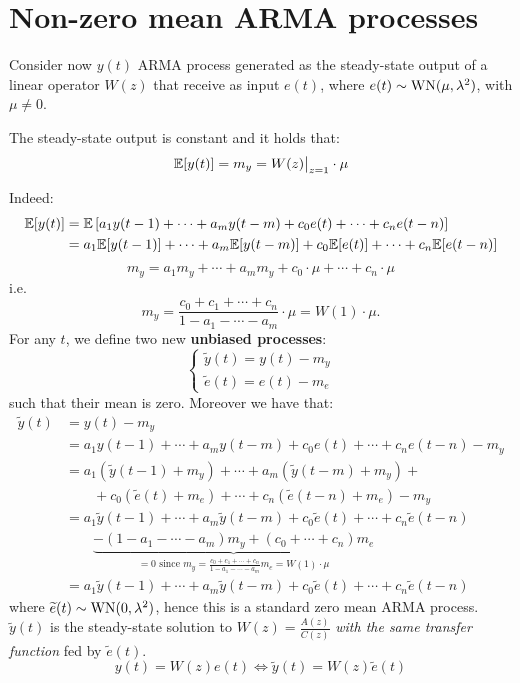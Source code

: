 \section{Non-zero mean ARMA processes}\label{sec:non-zero-mean-arma}
Consider now $y(t)$ ARMA process generated as the steady-state output of a linear operator $W(z)$ that receive as input $e(t)$, where $e(t) \sim \operatorname{WN}(\mu, \lambda^{2})$, with $\mu\neq0$.

\begin{thm}\label{thm:gain-theorem}
	The steady-state output is constant and it holds that:
	\[
		\mathbb{E}[y(t)]=m_{y}=W(z)\big|_{z=1} \cdot \mu
	\]
\end{thm}

Indeed:
\begin{align*}
		\mathbb{E}[y(t)] &=\mathbb{E}\left[a_{1} y(t-1)+\cdots+a_{m} y(t-m)+c_{0} e(t)+\cdots+c_{n} e(t-n)\right] \\
		&=a_{1} \mathbb{E}[y(t-1)]+\cdots+a_{m} \mathbb{E}[y(t-m)]+c_{0} \mathbb{E}[e(t)]+\cdots+c_{n} \mathbb{E}[e(t-n)]
\end{align*}
$$
m_{y}=a_{1} m_{y}+\cdots+a_{m} m_{y}+c_{0} \cdot \mu+\cdots+c_{n} \cdot \mu
$$
i.e.
\[
	m_{y}=\frac{c_{0}+c_{1}+\cdots+c_{n}}{1-a_{1}-\cdots-a_{m}} \cdot \mu=W(1) \cdot \mu.
\]
For any $t$, we define two new \textbf{unbiased processes}:
$$
\boxed{
	\begin{cases}
		\tilde{y}(t)=y(t)-m_{y}\\
		\tilde{e}(t)=e(t)-m_{e}
	\end{cases}
}
$$
such that their mean is zero. Moreover we have that:
\begin{align*}
	\tilde{y}(t)&= y(t)-m_{y}\\
	&= a_{1} y(t-1)+\cdots+a_{m} y(t-m)+c_{0} e(t)+\cdots+c_{n} e(t-n)-m_{y} \\
	&= a_{1}\left(\tilde{y}(t-1)+m_{y}\right)+\cdots+a_{m }\left(\tilde{y}(t-m)+m_{y}\right)+\\
	&\qquad +c_{0}\left(\tilde{e}(t)+m_{e}\right)+\cdots+c_{n}\left(\tilde{e}(t-n)+m_{e}\right)-m_{y} \\
	&= a_{1} \tilde{y}(t-1)+\cdots+a_{m} \tilde{y}(t-m)+c_{0} \tilde{e}(t)+\cdots+c_{n} \tilde{e}(t-n) \\
	&\qquad \underbrace{-\left(1-a_{1}-\cdots-a_{m}\right) m_{y}+\left(c_{0}+\cdots + c_{n}\right) m_{e}}_{=0\text { since } m_{y}=\frac{c_{0}+c_{1}+\cdots+c_{n}}{1-a_{1}-\cdots-a_{m }} m_{e}=W(1) \cdot \mu} \\
	&=a_{1} \tilde{y}(t-1)+\cdots+a_{m} \tilde{y}(t-m)+c_{0} \tilde{e}(t)+\cdots+c_{n} \tilde{e}(t-n)
\end{align*}
where $\widetilde{e}(t)\sim \operatorname{WN}(0, \lambda^{2})$, hence this is a standard zero mean ARMA process. $\tilde{y}(t)$ is the steady-state solution to $W(z)=\frac{A(z)}{C(z)}$ \emph{with the same transfer function} fed by $\tilde{e}(t)$.
\[
	\boxed{y(t)=W(z)e(t) \iff \tilde{y}(t)=W(z)\tilde{e}(t)}
\]

